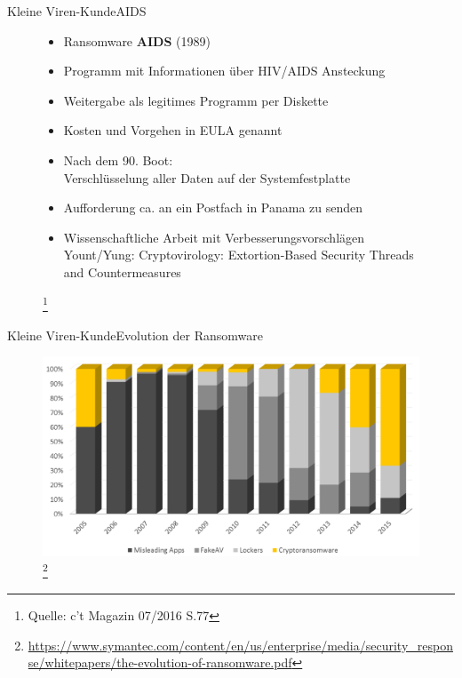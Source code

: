\documentclass[10pt]{beamer}
\begin{document}
\begin{frame}{Kleine Viren-Kunde}{AIDS}
	\begin{figure}[p]
		\begin{itemize}
			\item Ransomware \textbf{AIDS} (1989)
			\item Programm mit Informationen über HIV/AIDS Ansteckung
			\item Weitergabe als legitimes Programm per Diskette \pause
			\item Kosten und Vorgehen in EULA genannt
			\item Nach dem 90. Boot: \\ Verschlüsselung aller Daten auf der Systemfestplatte
			\item Aufforderung ca.  an ein Postfach in Panama zu senden \pause
			\item Wissenschaftliche Arbeit mit Verbesserungsvorschlägen \\
				Yount/Yung: Cryptovirology: Extortion-Based Security Threads and Countermeasures
		\end{itemize}
		\let\thefootnote\relax\footnote{Quelle: c't Magazin 07/2016 S.77}
	\end{figure}
\end{frame}


\begin{frame}{Kleine Viren-Kunde}{Evolution der Ransomware}
	\begin{figure}[p]
		\centering
		\includegraphics[scale=0.28]{ransom-evolution.png}
		\let\thefootnote\relax\footnote{\url{https://www.symantec.com/content/en/us/enterprise/media/security\_response/whitepapers/the-evolution-of-ransomware.pdf}}
	\end{figure}
\end{frame}
\end{document}
